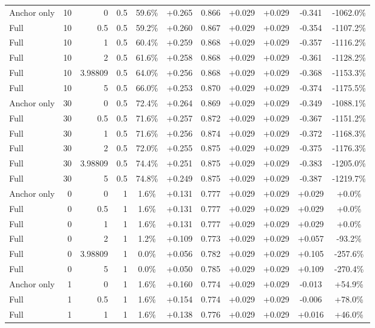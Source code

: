 \begin{table}[htbp]
\begin{tabular}{lrrrccccccc}
Anchor only & 10 & 0 & 0.5 & 59.6\% & +0.265 & 0.866 & +0.029 & +0.029 & -0.341 & -1062.0\% \\
Full & 10 & 0.5 & 0.5 & 59.2\% & +0.260 & 0.867 & +0.029 & +0.029 & -0.354 & -1107.2\% \\
Full & 10 & 1 & 0.5 & 60.4\% & +0.259 & 0.868 & +0.029 & +0.029 & -0.357 & -1116.2\% \\
Full & 10 & 2 & 0.5 & 61.6\% & +0.258 & 0.868 & +0.029 & +0.029 & -0.361 & -1128.2\% \\
Full & 10 & 3.98809 & 0.5 & 64.0\% & +0.256 & 0.868 & +0.029 & +0.029 & -0.368 & -1153.3\% \\
Full & 10 & 5 & 0.5 & 66.0\% & +0.253 & 0.870 & +0.029 & +0.029 & -0.374 & -1175.5\% \\
Anchor only & 30 & 0 & 0.5 & 72.4\% & +0.264 & 0.869 & +0.029 & +0.029 & -0.349 & -1088.1\% \\
Full & 30 & 0.5 & 0.5 & 71.6\% & +0.257 & 0.872 & +0.029 & +0.029 & -0.367 & -1151.2\% \\
Full & 30 & 1 & 0.5 & 71.6\% & +0.256 & 0.874 & +0.029 & +0.029 & -0.372 & -1168.3\% \\
Full & 30 & 2 & 0.5 & 72.0\% & +0.255 & 0.875 & +0.029 & +0.029 & -0.375 & -1176.3\% \\
Full & 30 & 3.98809 & 0.5 & 74.4\% & +0.251 & 0.875 & +0.029 & +0.029 & -0.383 & -1205.0\% \\
Full & 30 & 5 & 0.5 & 74.8\% & +0.249 & 0.875 & +0.029 & +0.029 & -0.387 & -1219.7\% \\
Anchor only & 0 & 0 & 1 & 1.6\% & +0.131 & 0.777 & +0.029 & +0.029 & +0.029 & +0.0\% \\
Full & 0 & 0.5 & 1 & 1.6\% & +0.131 & 0.777 & +0.029 & +0.029 & +0.029 & +0.0\% \\
Full & 0 & 1 & 1 & 1.6\% & +0.131 & 0.777 & +0.029 & +0.029 & +0.029 & +0.0\% \\
Full & 0 & 2 & 1 & 1.2\% & +0.109 & 0.773 & +0.029 & +0.029 & +0.057 & -93.2\% \\
Full & 0 & 3.98809 & 1 & 0.0\% & +0.056 & 0.782 & +0.029 & +0.029 & +0.105 & -257.6\% \\
Full & 0 & 5 & 1 & 0.0\% & +0.050 & 0.785 & +0.029 & +0.029 & +0.109 & -270.4\% \\
Anchor only & 1 & 0 & 1 & 1.6\% & +0.160 & 0.774 & +0.029 & +0.029 & -0.013 & +54.9\% \\
Full & 1 & 0.5 & 1 & 1.6\% & +0.154 & 0.774 & +0.029 & +0.029 & -0.006 & +78.0\% \\
Full & 1 & 1 & 1 & 1.6\% & +0.138 & 0.776 & +0.029 & +0.029 & +0.016 & +46.0\% \\

\end{tabular}
\end{table}
